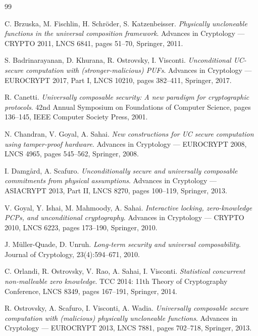 \documentclass{aicr-conjecture}
\begin{document}
\begin{aicrbibliography}{99}

C. Brzuska, M. Fischlin, H. Schr\"oder, S. Katzenbeisser.
\emph{Physically uncloneable functions in the universal composition
framework}.
Advances in Cryptology --- CRYPTO 2011, LNCS 6841, pages 51--70,
Springer, 2011.

S. Badrinarayanan, D. Khurana, R. Ostrovsky, I. Visconti.
\emph{Unconditional UC-secure computation with (stronger-malicious)
PUFs}.
Advances in Cryptology --- EUROCRYPT 2017, Part I, LNCS 10210, pages
382--411, Springer, 2017.

R. Canetti.
\emph{Universally composable security: A new paradigm for cryptographic
protocols}.
42nd Annual Symposium on Foundations of Computer Science, pages
136--145, IEEE Computer Society Press, 2001.

N. Chandran, V. Goyal, A. Sahai.
\emph{New constructions for UC secure computation using tamper-proof
hardware}.
Advances in Cryptology --- EUROCRYPT 2008, LNCS 4965, pages 545--562,
Springer, 2008.

I. Damg\aa{}rd, A. Scafuro.
\emph{Unconditionally secure and universally composable commitments
from physical assumptions}.
Advances in Cryptology --- ASIACRYPT 2013, Part II, LNCS 8270, pages
100--119, Springer, 2013.

V. Goyal, Y. Ishai, M. Mahmoody, A. Sahai.
\emph{Interactive locking, zero-knowledge PCPs, and unconditional
cryptography}.
Advances in Cryptology --- CRYPTO 2010, LNCS 6223, pages 173--190,
Springer, 2010.

J. M\"uller-Quade, D. Unruh.
\emph{Long-term security and universal composability}.
Journal of Cryptology, 23(4):594--671, 2010.

C. Orlandi, R. Ostrovsky, V. Rao, A. Sahai, I. Visconti.
\emph{Statistical concurrent non-malleable zero knowledge}.
TCC 2014: 11th Theory of Cryptography Conference, LNCS 8349, pages
167--191, Springer, 2014.

R. Ostrovsky, A. Scafuro, I. Visconti, A. Wadia.
\emph{Universally composable secure computation with (malicious)
physically uncloneable functions}.
Advances in Cryptology --- EUROCRYPT 2013, LNCS 7881, pages 702--718,
Springer, 2013.

\end{aicrbibliography}
\end{document}
